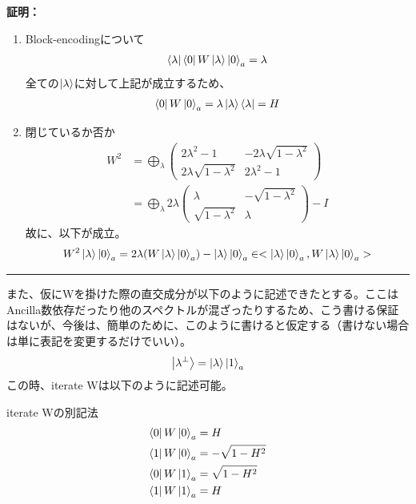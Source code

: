 \documentclass[a4paper,10.5pt]{article}
\numberwithin{equation}{section}
\newenvironment{proofbox}
{\begin{prooflabel}\textbf{証明：}\end{prooflabel}\vspace{0.8em}}
{\par\vspace{1em}\hrule\vspace{1em}}
\begin{document}
\begin{proofbox}
\begin{enumerate}
    \item Block-encodingについて
    \begin{align*}
        \bra{\lambda}\bra{0}W\ket{\lambda}\ket{0}_{a}=\lambda
    \end{align*}
    全ての$\ket{\lambda}$に対して上記が成立するため、
    \begin{align*}
        \bra{0}W\ket{0}_{a}=\lambda\ket{\lambda}\bra{\lambda}=H
    \end{align*}
    \item 閉じているか否か
    \begin{align*}
        W^{2}&=\bigoplus_{\lambda} \begin{pmatrix}
            2\lambda^{2}-1 & -2\lambda\sqrt{1-\lambda^{2}}\\
            2\lambda\sqrt{1-\lambda^{2}} & 2\lambda^{2}-1
        \end{pmatrix} \\
        &=\bigoplus_{\lambda} 2\lambda\begin{pmatrix}
            \lambda & -\sqrt{1-\lambda^{2}}\\
            \sqrt{1-\lambda^{2}} & \lambda
        \end{pmatrix}
        -I
    \end{align*}
    故に、以下が成立。
    \begin{align*}
    W^{2}\ket{\lambda}\ket{0}_{a}=2\lambda(W\ket{\lambda}\ket{0}_{a})-\ket{\lambda}\ket{0}_{a}\in <\ket{\lambda}\ket{0}_{a},W\ket{\lambda}\ket{0}_{a}>
    \end{align*}
\end{enumerate}
\end{proofbox}
また、仮にWを掛けた際の直交成分が以下のように記述できたとする。ここはAncilla数依存だったり他のスペクトルが混ざったりするため、こう書ける保証はないが、今後は、簡単のために、このように書けると仮定する（書けない場合は単に表記を変更するだけでいい）。
\begin{align*}
    \ket{\lambda^{\perp}}=\ket{\lambda}\ket{1}_{a}
\end{align*}
この時、iterate Wは以下のように記述可能。
\begin{resultbox}{iterate Wの別記法}
    \begin{align*}
        \bra{0}W\ket{0}_{a}&=H\\
        \bra{1}W\ket{0}_{a}&=-\sqrt{1-H^{2}}\\
        \bra{0}W\ket{1}_{a}&=\sqrt{1-H^{2}}\\
        \bra{1}W\ket{1}_{a}&=H
    \end{align*}
\end{resultbox}
\end{document}
